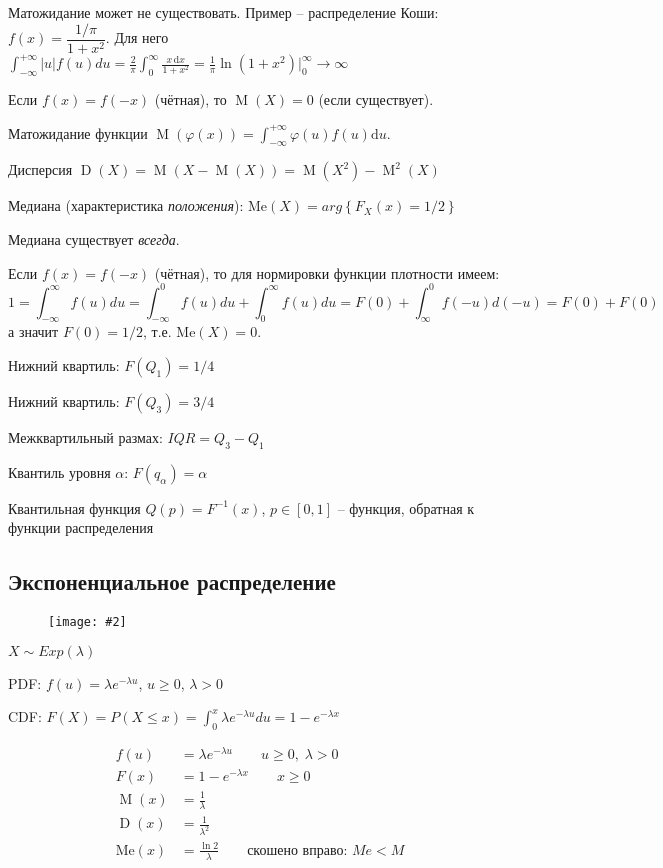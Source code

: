 \documentclass[a4paper,12pt,fleqn]{article}
\numberwithin{figure}{section}
\newcommand\cfigure[2]{
	\begin{figure}[H] \centering \texttt{[image: \#2]} \end{figure}
}
\theoremstyle{definition}
\let\phi\varphi
\let\leqs\leqslant
\let\geqs\geqslant
\let\DS\displaystyle
\def\d{\mathrm{d}}
\DeclareMathOperator{\M}{M}
\DeclareMathOperator{\D}{D}
\begin{document}
Матожидание может не существовать.
Пример -- распределение Коши: $f(x)=\dfrac{1/\pi}{1+x^2}$.
Для него $\DS \int_{-\infty}^{+\infty}|u|f(u)du
            = \frac2\pi \int_0^\infty \frac{x\,\mathrm{d}x}{1+x^2}
            = \frac1\pi \ln(1+x^2) \Big\rvert_0^\infty \to \infty$

Если $f(x)=f(-x)$ (чётная), то $\M(X)=0$ (если существует).

\medskip

Матожидание функции
$\M\left( \phi(x) \right) = \int_{-\infty}^{+\infty}\phi(u) f(u) \d u$.

\medskip

Дисперсия $\D(X) = \M\left( X-\M(X) \right) = \M(X^2)-\M^2(X)$

\bigskip

Медиана (характеристика \textit{положения}):
$\mathrm{Me}(X) = arg \left\{ F_X(x) = 1/2 \right\}$

Медиана существует \textit{всегда}.

Если $f(x)=f(-x)$ (чётная), то для нормировки функции плотности имеем:
\[ 1 = \int_{-\infty}^\infty f(u)du
     = \int_{-\infty}^0 f(u)du + \int_0^\infty f(u)du
     = F(0) + \int_\infty^0 f(-u)d(-u) = F(0) + F(0) \]
а значит $F(0)=1/2$, т.е. $\mathrm{Me}(X) = 0$.

\bigskip

Нижний квартиль: $F(Q_1) = 1/4$

Нижний квартиль: $F(Q_3) = 3/4$

Межквартильный размах: $IQR=Q_3-Q_1$

\medskip

Квантиль уровня $\alpha$: $F(q_{\alpha})=\alpha$

Квантильная функция $Q(p)=F^{-1}(x)$, $p\!\in\![0,1]$ --
функция, обратная к функции распределения


\subsection{Экспоненциальное распределение}

\cfigure{.9\linewidth}{exp-dist.png}

$X \sim Exp(\lambda)$

PDF: $\DS f(u) = \lambda e^{-\lambda u}$, $u\geqs0$, $\lambda>0$

CDF: $\DS F(X) = P(X\leqs x) = \int_0^x \lambda e^{-\lambda u} du = 1-e^{-\lambda x}$

\begin{align*}
	   f(u)&=\lambda e^{-\lambda u} \qquad u\geqs 0 ,\; \lambda>0
	\\ F(x)&=1-e^{-\lambda x} \qquad x\geqs 0
	\\ \M(x)&=\frac{1}{\lambda}
	\\ \D(x)&=\frac{1}{\lambda^2}
	\\ \mathrm{Me}(x)&=\frac{\ln 2}{\lambda} \qquad \text{скошено вправо: } Me<M
\end{align*}
\end{document}
